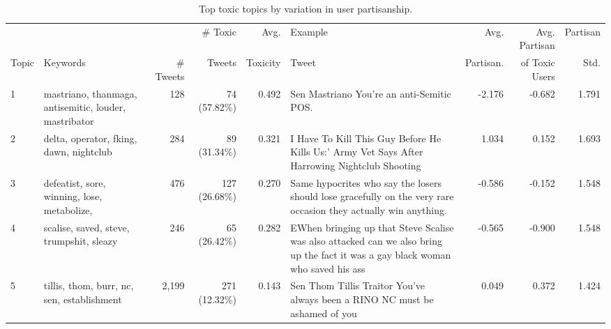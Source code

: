 \begin{table}
\centering
\scriptsize
\selectfont
\setlength{\tabcolsep}{4pt}
\begin{tabularx}{\textwidth}{l|XrrrXrrr}
\toprule
 &   &  &   \# Toxic  & Avg.& Example & Avg.  & Avg. Partisan  & Partisan \\
 Topic& {Keywords}&\# Tweets & Tweets & Toxicity &  Tweet  & Partisan. & of Toxic Users& Std. \\

\midrule
1 & mastriano, thanmaga, antisemitic, louder, mastribator & 128& 74 (57.82\%) &0.492 & Sen Mastriano You're an anti-Semitic POS.
 & -2.176& -0.682 & 1.791 \\
 2& delta, operator, fking, dawn, nightclub & 284 & 89 (31.34\%)& 0.321 &I Have To Kill This Guy Before He Kills Us:' Army Vet Says After Harrowing Nightclub Shooting & 1.034& 0.152 & 1.693 \\

 3 & defeatist, sore, winning, lose, metabolize, & 476 & 127 (26.68\%) & 0.270&Same hypocrites who say the losers should lose gracefully on the very rare occasion they actually win anything. & -0.586 &-0.152 & 1.548 \\

4 & scalise, saved, steve, trumpshit, sleazy & 246 & 65 (26.42\%)& 0.282 & EWhen bringing up that Steve Scalise was also attacked can we also bring up the fact it was a gay black woman who saved his ass & -0.565 &-0.900& 1.548 \\

5 & tillis, thom, burr, nc, sen, establishment & 2,199&271 (12.32\%)& 0.143 & Sen Thom Tillis Traitor 
You've always been a RINO
NC must be ashamed of you  & 0.049 & 0.372 & 1.424 \\
 
\bottomrule 
\end{tabularx}
\caption{\label{tab:variance-topics} Top toxic topics by variation in user partisanship.} 
\vspace{-10pt}
\end{table}